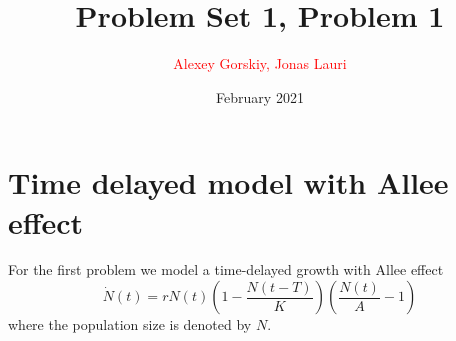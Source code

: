 \documentclass[11pt,a4paper]{article}
\title{Problem Set 1, Problem 1}
\author{\textcolor{red}{Alexey Gorskiy, Jonas Lauri}}
\date{February 2021}
\begin{document}
\maketitle

\section*{Time delayed model with Allee effect}
For the first problem we model a time-delayed growth with Allee effect
\begin{equation}
    \dot{N}(t) = rN(t) \left(1 - \frac{N(t - T)}{K} \right) \left(\frac{N(t)}{A} - 1\right) \label{model}
\end{equation}
where the population size is denoted by $N$.
\end{document}
